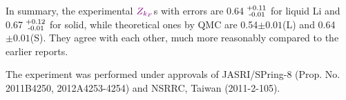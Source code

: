 \documentclass[twocolumn,showpacs,showkeys,fleqn,prl,superscriptaddress]{revtex4}%
\newcommand{\nn}[1]{\textnormal{ #1}}
\begin{document}
In summary,  the experimental ${\color{violet}Z_{k_F}}$s with errors are 0.64$^{\nn{+0.11}}_{\nn{\;-0.01}}$ for liquid Li and 0.67$^{\nn{+0.12}}_{\nn{\;-0.01}}$ for solid, %
while theoretical ones by QMC are {\color{red}0.54$\pm0.01$(L) and 0.64$\pm0.01$(S)}.
They agree with each other, much more reasonably compared to the earlier reports.%



The experiment was performed under approvals of JASRI/SPring-8 (Prop. No. 2011B4250, 2012A4253-4254) and NSRRC, Taiwan (2011-2-105).
 
       

%
%



\end{document}
